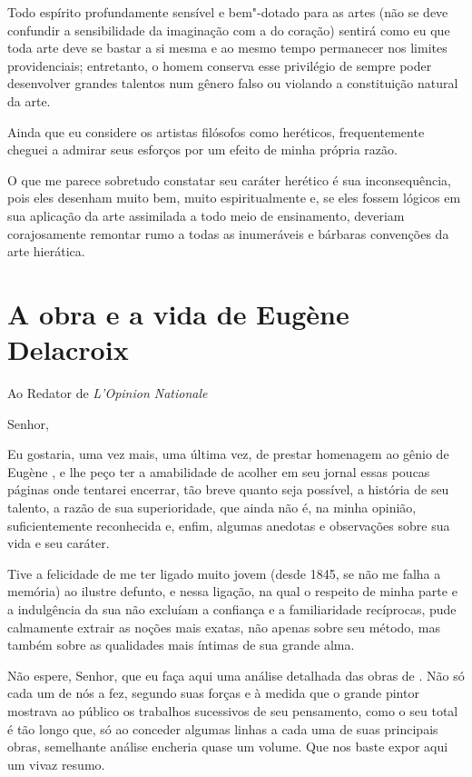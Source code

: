 Todo espírito profundamente sensível e bem"-dotado para as artes (não se
deve confundir a sensibilidade da imaginação com a do coração) sentirá
como eu que toda arte deve se bastar a si mesma e ao mesmo tempo
permanecer nos limites providenciais; entretanto, o homem conserva esse
privilégio de sempre poder desenvolver grandes talentos num gênero
falso ou violando a constituição natural da arte.

Ainda que eu considere os artistas filósofos como heréticos,
frequentemente cheguei a admirar seus esforços por um efeito de minha
própria razão.

O que me parece sobretudo constatar seu caráter herético é sua
inconsequência, pois eles desenham muito bem, muito espiritualmente e,
se eles fossem lógicos em sua aplicação da arte assimilada a todo meio
de ensinamento, deveriam corajosamente remontar rumo a todas as
inumeráveis e bárbaras convenções da arte hierática.

\movetooddpage
{}
\chapter*{A obra e a vida de Eugène Delacroix}

Ao Redator de \textit{L'Opinion Nationale}

\vspace{1em}
Senhor,

Eu gostaria, uma vez mais, uma última vez, de prestar homenagem ao gênio
de Eugène , e lhe peço ter a amabilidade de acolher em seu
jornal essas poucas páginas onde tentarei encerrar, tão breve quanto
seja possível, a história de seu talento, a razão de sua superioridade,
que ainda não é, na minha opinião, suficientemente reconhecida e,
enfim, algumas anedotas e observações sobre sua vida e seu caráter.

Tive a felicidade de me ter ligado muito jovem (desde 1845, se não me
falha a memória) ao ilustre defunto, e nessa ligação, na qual o
respeito de minha parte e a indulgência da sua não excluíam a confiança
e a familiaridade recíprocas, pude calmamente extrair as noções mais
exatas, não apenas sobre seu método, mas também sobre as qualidades
mais íntimas de sua grande alma.

Não espere, Senhor, que eu faça aqui uma análise detalhada das obras de
. Não só cada um de nós a fez, segundo suas forças e à medida
que o grande pintor mostrava ao público os trabalhos sucessivos de seu
pensamento, como o seu total é tão longo que, só ao conceder algumas
linhas a cada uma de suas principais obras, semelhante análise encheria
quase um volume. Que nos baste expor aqui um vivaz resumo.

